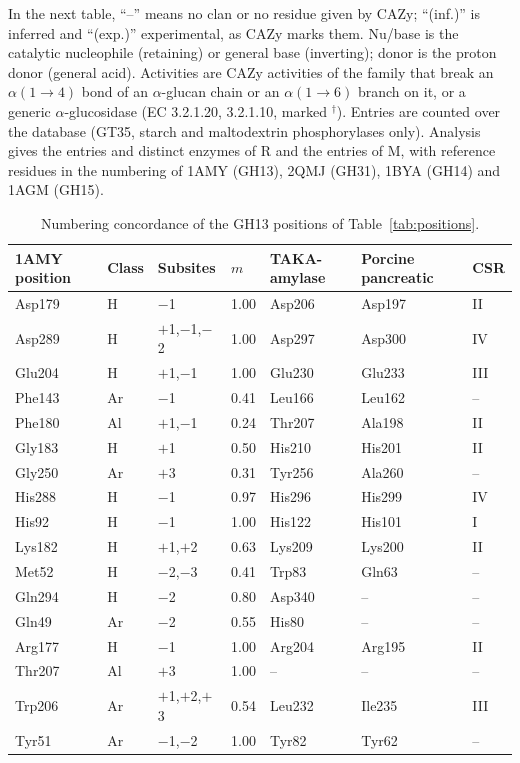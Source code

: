 \documentclass[preprint,12pt]{elsarticle}
\begin{document}
In the next table, ``--'' means no clan or no residue given by CAZy; ``(inf.)'' is inferred and ``(exp.)'' experimental, as CAZy marks them. Nu/base is the catalytic nucleophile (retaining) or general base (inverting); donor is the proton donor (general acid). Activities are CAZy activities of the family that break an $\alpha(1\!\to\!4)$ bond of an $\alpha$-glucan chain or an $\alpha(1\!\to\!6)$ branch on it, or a generic $\alpha$-glucosidase (EC 3.2.1.20, 3.2.1.10, marked $^\dagger$). Entries are counted over the database (GT35, starch and maltodextrin phosphorylases only). Analysis gives the entries and distinct enzymes of R and the entries of M, with reference residues in the numbering of 1AMY (GH13), 2QMJ (GH31), 1BYA (GH14) and 1AGM (GH15).

\begin{table}[h]
\centering\scriptsize
\caption{Numbering concordance of the GH13 positions of Table~\ref{tab:positions}.}
\label{tab:concord}
\begin{tabular}{lllllll}
\toprule
1AMY position & Class & Subsites & $m$ & TAKA-amylase & Porcine pancreatic & CSR\\
\midrule
Asp179 & H & $-$1 & 1.00 & Asp206 & Asp197 & II\\
Asp289 & H & $+$1,$-$1,$-$2 & 1.00 & Asp297 & Asp300 & IV\\
Glu204 & H & $+$1,$-$1 & 1.00 & Glu230 & Glu233 & III\\
Phe143 & Ar & $-$1 & 0.41 & Leu166 & Leu162 & --\\
Phe180 & Al & $+$1,$-$1 & 0.24 & Thr207 & Ala198 & II\\
Gly183 & H & $+$1 & 0.50 & His210 & His201 & II\\
Gly250 & Ar & $+$3 & 0.31 & Tyr256 & Ala260 & --\\
His288 & H & $-$1 & 0.97 & His296 & His299 & IV\\
His92 & H & $-$1 & 1.00 & His122 & His101 & I\\
Lys182 & H & $+$1,$+$2 & 0.63 & Lys209 & Lys200 & II\\
Met52 & H & $-$2,$-$3 & 0.41 & Trp83 & Gln63 & --\\
Gln294 & H & $-$2 & 0.80 & Asp340 & -- & --\\
Gln49 & Ar & $-$2 & 0.55 & His80 & -- & --\\
Arg177 & H & $-$1 & 1.00 & Arg204 & Arg195 & II\\
Thr207 & Al & $+$3 & 1.00 & -- & -- & --\\
Trp206 & Ar & $+$1,$+$2,$+$3 & 0.54 & Leu232 & Ile235 & III\\
Tyr51 & Ar & $-$1,$-$2 & 1.00 & Tyr82 & Tyr62 & --\\
\bottomrule
\end{tabular}
\end{table}
\end{document}
